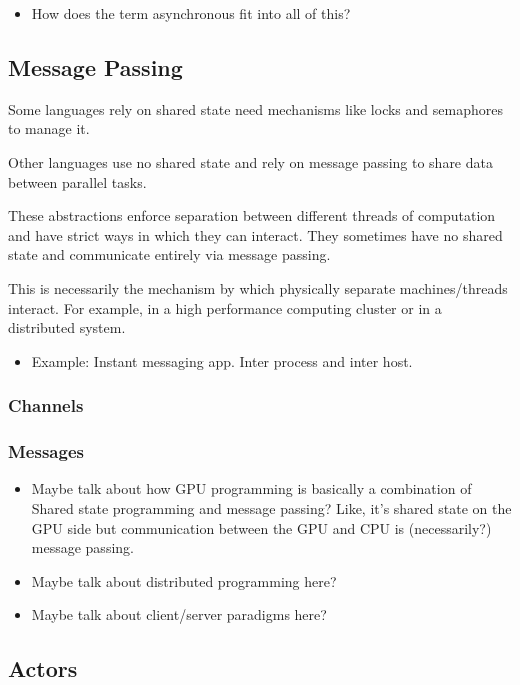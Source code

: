 \documentclass{article}
\begin{document}
\begin{itemize}
  \item How does the term asynchronous fit into all of this?
\end{itemize}

\subsection{Message Passing}
Some languages rely on shared state need mechanisms like
locks and semaphores to manage it.

Other languages use no shared state and rely on message passing to
share data between parallel tasks.

These abstractions enforce separation between different threads of
computation and have strict ways in which they can interact. They
sometimes have no shared state and communicate entirely via message
passing.

This is necessarily the mechanism by which physically separate machines/threads
interact. For example, in a high performance computing cluster or in a
distributed system.

\begin{itemize}
  \item Example: Instant messaging app. Inter process and inter host.
\end{itemize}

\subsubsection{Channels}
\subsubsection{Messages}

\begin{itemize}
  \item Maybe talk about how GPU programming is basically a combination of
        Shared state programming and message passing? Like, it's shared state on
        the GPU side but communication between the GPU and CPU is (necessarily?)
        message passing.
  \item Maybe talk about distributed programming here?
  \item Maybe talk about client/server paradigms here?
\end{itemize}

\subsection{Actors}
\end{document}
